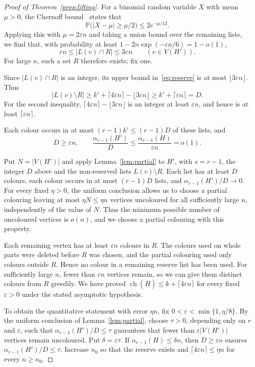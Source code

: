\documentclass[11pt]{article}
\numberwithin{equation}{section}
\newcommand{\ch}{\operatorname{ch}}
\newcommand{\Prob}{\mathbb P}
\newcommand{\ov}[1]{\overline{#1}}
\begin{document}
\begin{proof}[Proof of Theorem~\ref{prop:lifting}]
For a binomial random variable $X$ with mean $\mu>0$, the Chernoff bound~\cite[Corollary~2.3]{JLR} states that
\[
 \Prob\bigl(|X-\mu|\ge\mu/2\bigr)\le2e^{-\mu/12}.
\]
Applying this with $\mu=2\varepsilon n$ and taking a union bound over the remaining lists, we find that, with probability at least $1-2n\exp(-\varepsilon n/6)=1-o(1)$,
\begin{equation}\label{eq:reserve}
 \varepsilon n\le |L(v)\cap R|\le3\varepsilon n
 \qquad(v\in V(H')).
\end{equation}
For large $n$, such a set $R$ therefore exists; fix one.

  
Since $|L(v)\cap R|$ is an integer, its upper bound in~\eqref{eq:reserve} is at most $\lfloor3\varepsilon n\rfloor$. Thus
\[
 |L(v)\setminus R|
 \ge k'+\lceil4\varepsilon n\rceil-\lfloor3\varepsilon n\rfloor
 \ge k'+\lceil\varepsilon n\rceil=D.
\]
For the second inequality, $\lceil4\varepsilon n\rceil-\lfloor3\varepsilon n\rfloor$ is an integer at least $\varepsilon n$, and hence is at least $\lceil\varepsilon n\rceil$.
 
Each colour occurs in at most $(r-1)k'\le(r-1)D$ of these lists, and
\[
 D\ge\varepsilon n,
 \qquad
 \frac{\alpha_{r-1}(H')}{D}
 \le\frac{\alpha_{r-1}(H)}{\varepsilon n}=o(1).
\]
  
Put $N=|V(H')|$ and apply Lemma~\ref{lem:partial} to $H'$, with $s=r-1$, the integer $D$ above and the non-reserved lists $L(v)\setminus R$. Each list has at least $D$ colours, each colour occurs in at most $(r-1)D$ lists, and $\alpha_{r-1}(H')/D\to0$. For every fixed $\eta>0$, the uniform conclusion allows us to choose a partial colouring leaving at most $\eta N\le\eta n$ vertices uncoloured for all sufficiently large $n$, independently of the value of $N$. Thus the minimum possible number of uncoloured vertices is $o(n)$, and we choose a partial colouring with this property.
 

Each remaining vertex has at least $\varepsilon n$ colours in $R$. The colours used on whole parts were deleted before $R$ was chosen, and the partial colouring used only colours outside $R$. Hence no colour in a remaining reserve list has been used. For sufficiently large $n$, fewer than $\varepsilon n$ vertices remain, so we can give them distinct colours from $R$ greedily. We have proved $\ch(\ov H)\le k+\lceil4\varepsilon n\rceil$ for every fixed $\varepsilon>0$ under the stated asymptotic hypothesis.

To obtain the quantitative statement with error $\eta n$, fix $0<\varepsilon<\min\{1,\eta/8\}$. By the uniform conclusion of Lemma~\ref{lem:partial}, choose $\tau>0$, depending only on $r$ and $\varepsilon$, such that $\alpha_{r-1}(H')/D\le\tau$ guarantees that fewer than $\varepsilon|V(H')|$ vertices remain uncoloured. Put $\delta=\varepsilon\tau$. If $\alpha_{r-1}(H)\le\delta n$, then $D\ge\varepsilon n$ ensures $\alpha_{r-1}(H')/D\le\tau$. Increase $n_0$ so that the reserve exists and $\lceil4\varepsilon n\rceil\le\eta n$ for every $n\ge n_0$.
  

\end{proof}
\end{document}
